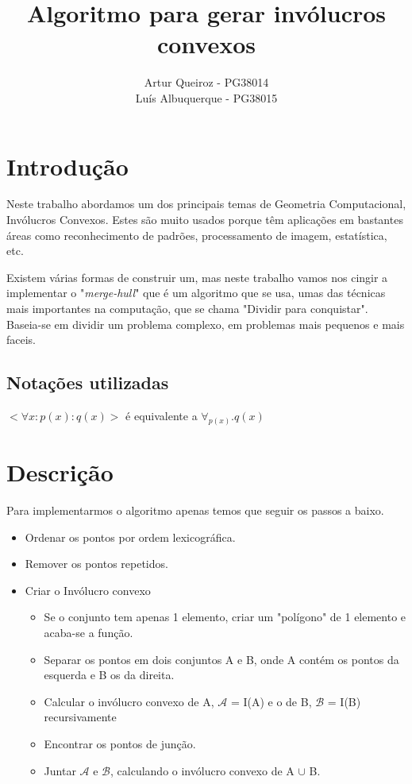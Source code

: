 \documentclass[11pt]{article}
\title{Algoritmo para gerar invólucros convexos}
\author{Artur Queiroz - PG38014\\Luís Albuquerque - PG38015}
\begin{document}
\maketitle

\section{Introdução}
Neste trabalho abordamos um dos principais temas de Geometria 
Computacional, Invólucros Convexos.
Estes são muito usados porque têm aplicações em bastantes áreas
como reconhecimento de padrões, processamento de imagem, 
estatística, etc.

Existem várias formas de construir um, mas neste trabalho vamos
nos cingir a implementar o "\textit{merge-hull}"
que é um algoritmo que se usa, umas das técnicas mais importantes
na computação, que se chama "Dividir para conquistar".
Baseia-se em dividir um problema complexo, em problemas mais 
pequenos e mais faceis.

\subsection{Notações utilizadas}
$<\forall x : p(x) : q(x)>$ é equivalente a $\forall_{p(x)} . q(x)$

\section{Descrição}
Para implementarmos o algoritmo apenas temos que seguir os passos
a baixo.

\begin{itemize}
    \item Ordenar os pontos por ordem lexicográfica.
    \item Remover os pontos repetidos.
    \item Criar o Invólucro convexo
    \begin{itemize}
        \item Se o conjunto tem apenas 1 elemento, criar um "polígono"
            de 1 elemento e acaba-se a função.
        \item Separar os pontos em dois conjuntos A e B, 
            onde A contém os pontos da esquerda e B os da direita.
        \item Calcular o invólucro convexo de A, 
            $\mathcal{A}$ = I(A) e o de B, $\mathcal{B}$ = I(B) recursivamente
        \item Encontrar os pontos de junção.
        \item Juntar $\mathcal{A}$ e $\mathcal{B}$, 
            calculando o invólucro convexo de A $\cup$ B.
    \end{itemize}
\end{itemize}
\end{document}
